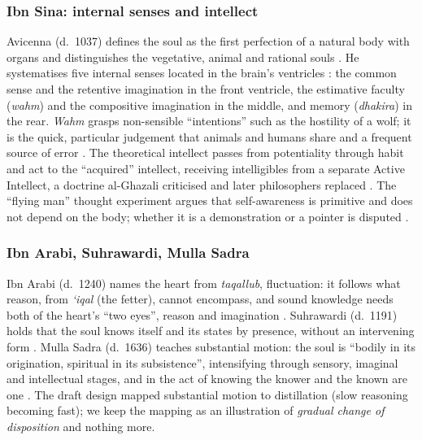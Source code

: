 \subsubsection{Ibn Sina: internal senses and intellect}
Avicenna (d.~1037) defines the soul as the first perfection of a natural body
with organs and distinguishes the vegetative, animal and rational souls
\cite{Avicenna1952Psychology,Avicenna1959DeAnima,McGinnis2010,Gutas2025SEPIbnSina}.
He systematises five internal senses located in the brain's ventricles
\cite{Ivry2012SEPArabicMind}: the common sense and the retentive imagination
in the front ventricle, the estimative faculty (\emph{wahm}) and the
compositive imagination in the middle, and memory (\emph{dhakira}) in the rear.
\emph{Wahm} grasps non-sensible ``intentions'' such as the hostility of a wolf;
it is the quick, particular judgement that animals and humans share and a
frequent source of error \cite{Black1993Estimation}. The theoretical intellect
passes from potentiality through habit and act to the ``acquired'' intellect,
receiving intelligibles from a separate Active Intellect, a doctrine
al-Ghazali criticised and later philosophers replaced
\cite{Gutas2014,Rizvi2019SEPMullaSadra}. The ``flying man'' thought experiment
argues that self-awareness is primitive and does not depend on the body; whether
it is a demonstration or a pointer is disputed
\cite{Marmura1986FlyingMan,Kaukua2015}.

\subsubsection{Ibn Arabi, Suhrawardi, Mulla Sadra}
Ibn Arabi (d.~1240) names the heart from \emph{taqallub}, fluctuation: it
follows what reason, from \emph{\textquoteleft iqal} (the fetter), cannot
encompass, and sound knowledge needs both of the heart's ``two eyes'', reason
and imagination \cite{Chittick1989,Chittick2025SEPIbnArabi}. Suhrawardi
(d.~1191) holds that the soul knows itself and its states by presence,
without an intervening form \cite{Marcotte2019SEPSuhrawardi,HairiYazdi1992}.
Mulla Sadra (d.~1636) teaches substantial motion: the soul is ``bodily in its
origination, spiritual in its subsistence'', intensifying through sensory,
imaginal and intellectual stages, and in the act of knowing the knower and
the known are one \cite{Rizvi2009,Kalin2010,Rahman1975}. The draft design
mapped substantial motion to distillation (slow reasoning becoming fast); we
keep the mapping as an illustration of \emph{gradual change of disposition}
and nothing more.

